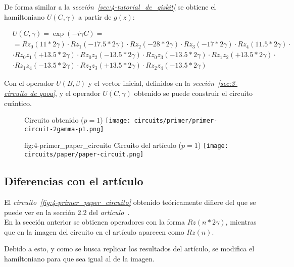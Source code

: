 \par
De forma similar a la \textit{sección~\ref{sec:4-tutorial_de_qiskit}} se obtiene el hamiltoniano $U(C, \gamma)$ a partir de $g(z)$:

\begin{align*}
  &U(C, \gamma) = \exp(-i \gamma C) = \\
  &= Rz_0(11*2\gamma) \cdot Rz_1(-17.5*2\gamma) \cdot Rz_2(-28*2\gamma) \cdot Rz_3(-17*2\gamma) \cdot Rz_4(11.5*2\gamma) \cdot \\
  & \cdot Rz_0z_1(+13.5 * 2\gamma) \cdot Rz_0z_2(-13.5 * 2\gamma) \cdot Rz_0z_3(-13.5 * 2\gamma) \cdot Rz_1z_2(+13.5 * 2\gamma) \cdot \\
  & \cdot Rz_1z_4(-13.5 * 2\gamma) \cdot Rz_2z_3(+13.5 * 2\gamma) \cdot Rz_2z_4(-13.5 * 2\gamma)
\end{align*}

Con el operador \(U(B, \beta)\) y el vector inicial, definidos en la \textit{sección~\ref{sec:3-circuito de qaoa}}, y el operador \(U(C, \gamma)\) obtenido se puede construir el circuito cuántico.

\begin{figure}[htbp]{}{ Circuito obtenido ($p=1$) }
  \centering
  \texttt{[image: circuits/primer/primer-circuit-2gamma-p1.png]}
\end{figure}

\begin{figure}[htbp]{fig:4-primer_paper_circuito}{ Circuito del artículo ($p=1$) }
  \centering
  \texttt{[image: circuits/paper/paper-circuit.png]}
\end{figure}

\subsection{Diferencias con el artículo\label{sec:4-primer_grafo_diferencias_con_el_articulo}}
El \textit{circuito~\ref{fig:4-primer_paper_circuito}} obtenido teóricamente difiere del que se puede ver en la sección 2.2 del \textit{artículo~\cite{multi-objective_routing_optimization}}. \\
En la sección anterior se obtienen operadores con la forma \(Rz(n*2\gamma)\), mientras que en la imagen del circuito en el artículo aparecen como \(Rz(n)\).

Debido a esto, y como se busca replicar los resultados del artículo, se modifica el hamiltoniano para que sea igual al de la imagen.

